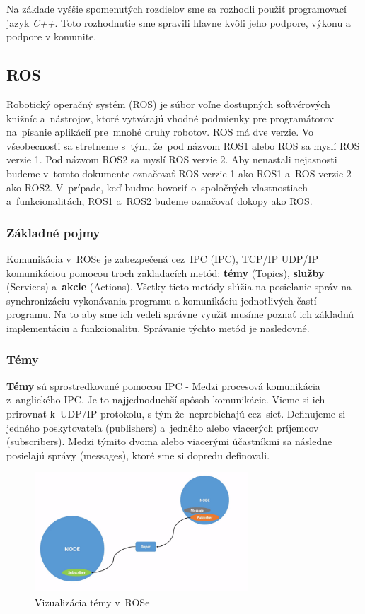 Na základe vyššie spomenutých rozdielov sme sa rozhodli použiť programovací jazyk \textit{C++}. Toto rozhodnutie sme spravili
hlavne kvôli jeho podpore, výkonu a podpore v komunite.

\subsection{ROS}
\label{sec:ros}

Robotický operačný systém (\acrlong{ROS}) je súbor voľne dostupných softvérových knižníc a~nástrojov, ktoré vytvárajú
vhodné podmienky pre programátorov na~písanie aplikácií pre~mnohé druhy robotov. ROS má dve verzie. Vo všeobecnosti sa stretneme
s~tým, že~pod názvom ROS1 alebo ROS sa myslí ROS verzie 1. Pod názvom ROS2 sa myslí ROS verzie 2. Aby nenastali nejasnosti
budeme v~tomto dokumente označovať ROS verzie 1 ako ROS1 a~ROS verzie 2 ako ROS2. V~prípade, keď budme hovoriť o~spoločných
vlastnostiach a~funkcionalitách, ROS1 a~ROS2 budeme označovať dokopy ako ROS.

\subsubsection{Základné pojmy}
\label{sec:zakladne_pojmy}

\noindent Komunikácia v~ROSe je zabezpečená cez~IPC (\acrlong{IPC}), TCP/IP UDP/IP komunikáciou pomocou troch zakladacích metód:
\textbf{témy} (Topics), \textbf{služby} (Services) a~\textbf{akcie} (Actions).
Všetky tieto metódy slúžia na posielanie správ na synchronizáciu vykonávania programu a komunikáciu jednotlivých častí programu.
Na to aby sme ich vedeli správne využiť musíme poznať ich základnú implementáciu a funkcionalitu. Správanie týchto metód je nasledovné.

\subsubsection{Témy}
\label{sec:topic}

	\textbf {Témy} sú sprostredkované pomocou IPC - Medzi procesová komunikácia z~anglického \acrlong{IPC}. Je to najjednoduchší spôsob
	komunikácie. Vieme si ich prirovnať k~UDP/IP protokolu, s tým že~neprebiehajú cez~sieť. Definujeme si jedného poskytovateľa (publishers)
	a~jedného alebo viacerých príjemcov (subscribers). Medzi týmito dvoma alebo viacerými účastníkmi sa následne posielajú správy (messages),
	ktoré sme si dopredu definovali.

	\begin{figure}[h]
		\centering
		\includegraphics[width=8cm]{img/topicsExplanation.png}
		\caption{Vizualizácia témy v~ROSe~\cite{RosDoc}}
		\label{fig:topics}
	\end{figure}

